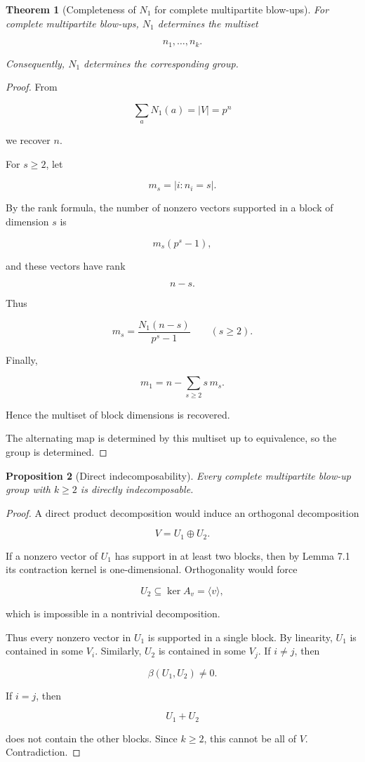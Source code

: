 \documentclass[11pt]{article}
\newtheorem{theorem}{Theorem}[section]
\newtheorem{proposition}[theorem]{Proposition}
\begin{document}
\begin{theorem}[Completeness of $N_1$ for complete multipartite blow-ups]

For complete multipartite blow-ups, $N_1$ determines the multiset

\[
{n_1,\dots,n_k}.
\]

Consequently, $N_1$ determines the corresponding group.

\end{theorem}
\begin{proof}

From

\[
\sum_aN_1(a)=|V|=p^n
\]

we recover $n$.

For $s\ge2$, let

\[
m_s=|{i:n_i=s}|.
\]

By the rank formula, the number of nonzero vectors supported in a block of dimension $s$ is

\[
m_s(p^s-1),
\]

and these vectors have rank

\[
n-s.
\]

Thus

\[
m_s=
\frac{N_1(n-s)}{p^s-1}
\qquad
(s\ge2).
\]

Finally,

\[
m_1
=n-\sum_{s\ge2}s\,m_s.
\]

Hence the multiset of block dimensions is recovered.

The alternating map is determined by this multiset up to equivalence, so the group is determined.
\end{proof}

\begin{proposition}[Direct indecomposability]

Every complete multipartite blow-up group with $k\ge2$ is directly indecomposable.

\end{proposition}
\begin{proof}

A direct product decomposition would induce an orthogonal decomposition

\[
V=U_1\oplus U_2.
\]

If a nonzero vector of $U_1$ has support in at least two blocks, then by Lemma 7.1 its contraction kernel is one-dimensional. Orthogonality would force

\[
U_2\subseteq \ker A_v=\langle v\rangle,
\]

which is impossible in a nontrivial decomposition.

Thus every nonzero vector in $U_1$ is supported in a single block. By linearity, $U_1$ is contained in some $V_i$. Similarly, $U_2$ is contained in some $V_j$. If $i\ne j$, then

\[
\beta(U_1,U_2)\ne0.
\]

If $i=j$, then

\[
U_1+U_2
\]

does not contain the other blocks. Since $k\ge2$, this cannot be all of $V$. Contradiction.
\end{proof}
\end{document}

